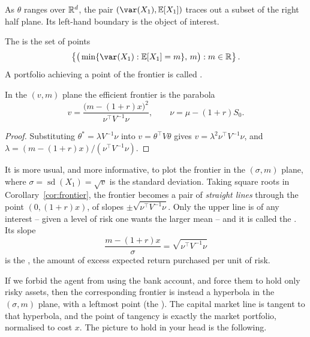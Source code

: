 \documentclass[a4paper]{scrartcl}
\newcommand{\sd}{\operatorname{sd}}
\begin{document}
As $\theta$ ranges over $\mathbb{R}^d$, the pair $(\var(X_1), \EE[X_1])$ traces out a subset of the right half plane. Its left-hand boundary is the object of interest.

\begin{definition}
	The  is the set of points
	$$
	\left\{ \big(\min\{\var(X_1) : \EE[X_1] = m\},\, m\big) : m \in \R \right\}.
	$$
	A portfolio achieving a point of the frontier is called .
\end{definition}

\begin{corollary}\label{cor:frontier}
	In the $(v,m)$ plane the efficient frontier is the parabola
	$$
	v = \frac{\big(m - (1+r)x\big)^2}{\nu^\top V^{-1}\nu}, \qquad \nu = \mu - (1+r)S_0.
	$$
\end{corollary}

\begin{proof}
	Substituting $\theta^* = \lambda V^{-1}\nu$ into $v = \theta^\top V\theta$ gives $v = \lambda^2 \nu^\top V^{-1}\nu$, and $\lambda = (m - (1+r)x)/(\nu^\top V^{-1}\nu)$.
\end{proof}

It is more usual, and more informative, to plot the frontier in the $(\sigma, m)$ plane, where $\sigma = \sd(X_1) = \sqrt{v}$ is the standard deviation. Taking square roots in Corollary~\ref{cor:frontier}, the frontier becomes a pair of \emph{straight lines} through the point $(0, (1+r)x)$, of slopes $\pm\sqrt{\nu^\top V^{-1}\nu}$. Only the upper line is of any interest -- given a level of risk one wants the larger mean -- and it is called the . Its slope
$$
\frac{m - (1+r)x}{\sigma} = \sqrt{\nu^\top V^{-1}\nu}
$$
is the , the amount of excess expected return purchased per unit of risk.

If we forbid the agent from using the bank account, and force them to hold only risky assets, then the corresponding frontier is instead a hyperbola in the $(\sigma,m)$ plane, with a leftmost point (the ). The capital market line is tangent to that hyperbola, and the point of tangency is exactly the market portfolio, normalised to cost $x$. The picture to hold in your head is the following.
\end{document}

